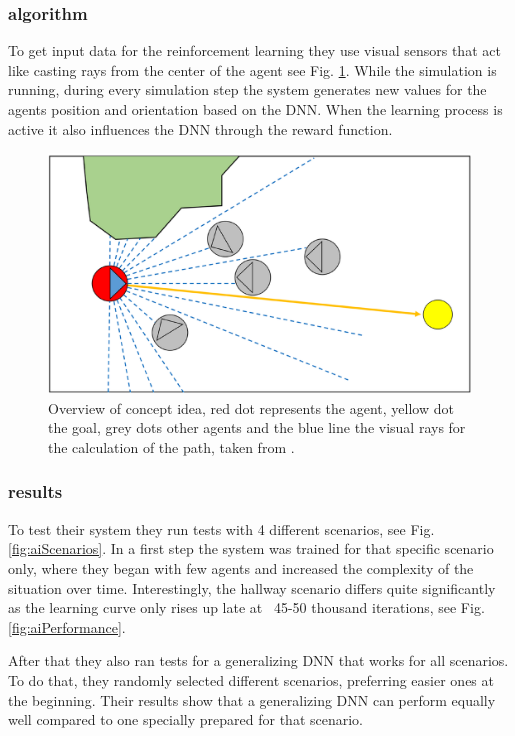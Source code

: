 \documentclass{acmsiggraph}               %
\begin{document}
\subsubsection{algorithm}
To get input data for the reinforcement learning they use visual sensors that act like casting rays from the center of the agent see Fig. \ref{fig:aiConceptOverview}. While the simulation is running, during every simulation step the system generates new values for the agents position and orientation based on the DNN. When the learning process is active it also influences the DNN through the reward function.
\begin{figure}[h]
  \centering
  \includegraphics[width=1\linewidth]{images/aiAlgortihmn.png}
  \caption{Overview of concept idea, red dot represents the agent, yellow dot the goal, grey dots other agents and the blue line the visual rays for the calculation of the path, taken from \protect\cite{lee_crowd_2018}.}
  \label{fig:aiConceptOverview}
\end{figure}

\subsubsection{results}
To test their system they run tests with 4 different scenarios, see Fig. \ref{fig:aiScenarios}. In a first step the system was trained for that specific scenario only, where they began with few agents and increased the complexity of the situation over time. Interestingly, the hallway scenario differs quite significantly as the learning curve only rises up late at ~45-50 thousand iterations, see Fig. \ref{fig:aiPerformance}.

After that they also ran tests for a generalizing DNN that works for all scenarios. To do that, they randomly selected different scenarios, preferring easier ones at the beginning. Their results show that a generalizing DNN can perform equally well compared to one specially prepared for that scenario. 
\end{document}
